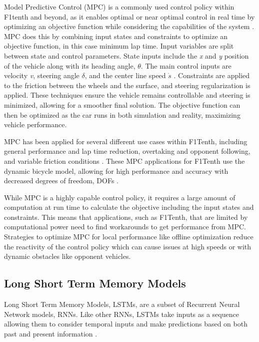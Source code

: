 \documentclass[conference]{IEEEtran}
\begin{document}
Model Predictive Control (MPC) is a commonly used control policy within F1tenth and beyond, as it enables optimal or near optimal control in real time by optimizing an objective function while considering the capabilities of the system \cite{evans2024unifying}. MPC does this by combining input states and constraints to optimize an objective function, in this case minimum lap time. Input variables are split between state and control parameters. State inputs include the \textit{x} and \textit{y} position of the vehicle along with its heading angle, $\theta$. The main control inputs are velocity \textit{v}, steering angle $\delta$, and the center line speed $\dot{s}$ \cite{evans2024unifying}. Constraints are applied to the friction between the wheels and the surface, and steering regularization is applied. These techniques ensure the vehicle remains controllable and steering is minimized, allowing for a smoother final solution. The objective function can then be optimized as the car runs in both simulation and reality, maximizing vehicle performance. 

 MPC has been applied for several different use cases within F1Tenth, including general performance and lap time reduction, overtaking and opponent following, and variable friction conditions \cite{cataffo2022nonlinear,bhargav2021track,li2023realtime,nagy2023adaptive}. These MPC applications for F1Tenth use the dynamic bicycle model, allowing for high performance and accuracy with decreased degrees of freedom, DOFs \cite{cataffo2022nonlinear,bhargav2021track,li2023realtime,nagy2023adaptive}.

While MPC is a highly capable control policy, it requires a large amount of computation at run time to calculate the objective including the input states and constraints. This means that applications, such as F1Tenth, that are limited by computational power need to find workarounds to get performance from MPC. Strategies to optimize MPC for local performance like offline optimization reduce the reactivity of the control policy which can cause issues at high speeds or with dynamic obstacles like opponent vehicles. 

\subsection{Long Short Term Memory Models}

Long Short Term Memory Models, LSTMs, are a subset of Recurrent Neural Network models, RNNs. Like other RNNs, LSTMs take inputs as a sequence allowing them to consider temporal inputs and make predictions based on both past and present information \cite{ai6090215}. %
\end{document}
